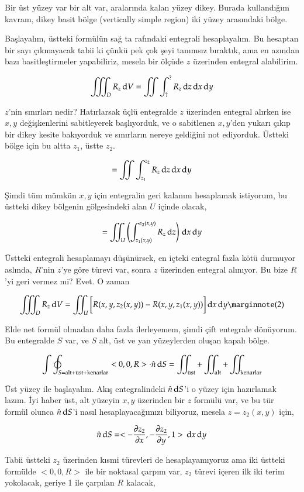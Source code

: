 \documentclass[12pt,fleqn]{article}\usepackage{../../common}
\begin{document}
Bir üst yüzey var bir alt var, aralarında kalan yüzey dikey. Burada kullandığım
kavram, dikey basit bölge (vertically simple region) iki yüzey arasındaki bölge.

Başlayalım, üstteki formülün sağ ta rafındaki entegrali hesaplayalım. Bu
hesaptan bir sayı çıkmayacak tabii ki çünkü pek çok şeyi tanımsız bıraktık, ama
en azından bazı basitleştirmeler yapabiliriz, mesela bir ölçüde $z$ üzerinden
entegral alabilirim. 

$$
\iiint_D R_z \,\mathrm{d} V = \iint \int_?^? R_z \,\mathrm{d} z \,\mathrm{d} x \,\mathrm{d} y
$$

$z$'nin sınırları nedir? Hatırlarsak üçlü entegralde $z$ üzerinden entegral
alırken ise $x,y$ değişkenlerini sabitleyerek başlıyorduk, ve o sabitlenen
$x,y$'den yukarı çıkıp bir dikey kesite bakıyorduk ve sınırların nereye
geldiğini not ediyorduk. Üstteki bölge için bu altta $z_1$, üstte $z_2$. 

$$
= \iint \int_{z_1}^{z_2} R_z \,\mathrm{d} z \,\mathrm{d} x \,\mathrm{d} y
$$

Şimdi tüm mümkün $x,y$ için entegralin geri kalanını hesaplamak istiyorum,
bu üstteki dikey bölgenin gölgesindeki alan $U$ içinde olacak, 

$$
= \iint_U \left( \int_{z_1(x,y)}^{z_2(x,y)} R_z \,\mathrm{d} z  \right) \,\mathrm{d} x \,\mathrm{d} y  
$$

Üstteki entegrali hesaplamayı düşünürsek, en içteki entegral fazla kötü durmuyor
aslında, $R$'nin $z$'ye göre türevi var, sonra $z$ üzerinden entegral alınıyor.
Bu bize $R$'yi geri vermez mi? Evet. O zaman

$$
\iiint_D R_z \ud V = \iint_U \bigg[ R(x,y,z_2(x,y)) - R(x,y,z_1(x,y))  \bigg]
\ud x \ud y
\mlabel{2}
$$

Elde net formül olmadan daha fazla ilerleyemem, şimdi çift entegrale dönüyorum.
Bu entegralde $S$ var, ve $S$ alt, üst ve yan yüzeylerden oluşan kapalı bölge.

$$
\int \oint_{S = \textrm{alt+üst+kenarlar}} < 0,0,R > \cdot \hat{n} \,\mathrm{d} S =
\iint_{\textrm{üst}} + \iint_{\textrm{alt}} + \iint_{\textrm{kenarlar}} 
$$

Üst yüzey ile başlayalım. Akış entegralindeki $\hat{n} \,\mathrm{d} S$'i o yüzey
için hazırlamak lazım. İyi haber üst, alt yüzeyin $x,y$ üzerinden bir $z$
formülü var, ve bu tür formül olunca $\hat{n} \,\mathrm{d} S$'i nasıl hesaplayacağımızı
biliyoruz, mesela $z=z_2(x,y)$ için,

$$
\hat{n} \,\mathrm{d} S =
< -\frac{\partial z_2}{\partial x},
-\frac{\partial z_2}{\partial y},
1 >
\,\mathrm{d} x \,\mathrm{d} y
$$

Tabii üstteki $z_2$ üzerinden kısmi türevleri de hesaplayamıyoruz ama
iki üstteki formülde $< 0,0,R >$ ile bir noktasal çarpım var, $z_2$
türevi içeren ilk iki terim yokolacak, geriye 1 ile çarpılan $R$
kalacak,
\end{document}
